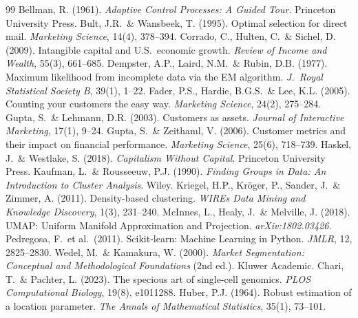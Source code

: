 \documentclass[10pt,a4paper]{article}
\begin{document}
{\small
\begin{thebibliography}{99}
\setlength{\itemsep}{1pt}
  Bellman, R. (1961). \textit{Adaptive Control Processes: A Guided Tour}.
  Princeton University Press.
  Bult, J.R.\ \& Wansbeek, T. (1995). Optimal selection for direct mail.
  \textit{Marketing Science}, 14(4), 378--394.
  Corrado, C., Hulten, C.\ \& Sichel, D. (2009). Intangible capital and U.S.\ economic
  growth. \textit{Review of Income and Wealth}, 55(3), 661--685.
  Dempster, A.P., Laird, N.M.\ \& Rubin, D.B. (1977). Maximum likelihood from
  incomplete data via the EM algorithm. \textit{J.\ Royal Statistical Society B},
  39(1), 1--22.
  Fader, P.S., Hardie, B.G.S.\ \& Lee, K.L. (2005). Counting your customers the easy way.
  \textit{Marketing Science}, 24(2), 275--284.
  Gupta, S.\ \& Lehmann, D.R. (2003). Customers as assets.
  \textit{Journal of Interactive Marketing}, 17(1), 9--24.
  Gupta, S.\ \& Zeithaml, V. (2006). Customer metrics and their impact on financial
  performance. \textit{Marketing Science}, 25(6), 718--739.
  Haskel, J.\ \& Westlake, S. (2018). \textit{Capitalism Without Capital}.
  Princeton University Press.
  Kaufman, L.\ \& Rousseeuw, P.J. (1990).
  \textit{Finding Groups in Data: An Introduction to Cluster Analysis}. Wiley.
  Kriegel, H.P., Kr\"{o}ger, P., Sander, J.\ \& Zimmer, A. (2011).
  Density-based clustering.
  \textit{WIREs Data Mining and Knowledge Discovery}, 1(3), 231--240.
  McInnes, L., Healy, J.\ \& Melville, J. (2018).
  UMAP: Uniform Manifold Approximation and Projection. \textit{arXiv:1802.03426}.
  Pedregosa, F.\ et al.\ (2011). Scikit-learn: Machine Learning in Python.
  \textit{JMLR}, 12, 2825--2830.
  Wedel, M.\ \& Kamakura, W. (2000).
  \textit{Market Segmentation: Conceptual and Methodological Foundations} (2nd ed.).
  Kluwer Academic.
  Chari, T.\ \& Pachter, L. (2023). The specious art of single-cell genomics.
  \textit{PLOS Computational Biology}, 19(8), e1011288.
  Huber, P.J. (1964). Robust estimation of a location parameter.
  \textit{The Annals of Mathematical Statistics}, 35(1), 73--101.

\end{thebibliography}}
\end{document}
